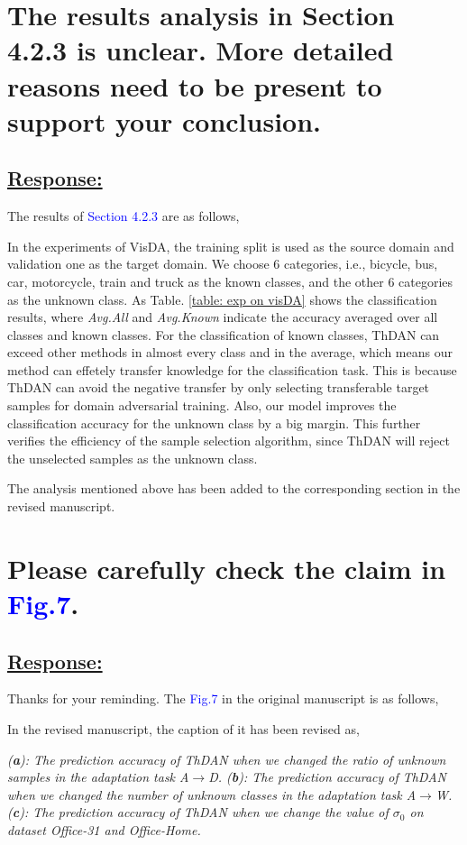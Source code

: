 \section{The results analysis in Section 4.2.3 is unclear. More detailed reasons need to be present to support your conclusion.}
\subsection*{\underline{\textbf{Response:}}}

The results of \textcolor{blue}{Section 4.2.3} are as follows,


In the experiments of VisDA, the training split is used as the source domain and validation one as the target domain.
We choose 6 categories, i.e., bicycle, bus, car, motorcycle, train and truck as the known classes, and the other 6 categories as the unknown class.
As Table. \ref{table: exp on visDA} shows the classification results, where \textit{Avg.All} and \textit{Avg.Known} indicate the accuracy averaged over all classes and known classes.
For the classification of known classes, ThDAN can exceed other methods in almost every class and in the average, which means our method can effetely transfer knowledge for the classification task.
This is because ThDAN can avoid the negative transfer by only selecting transferable target samples for domain adversarial training.
Also, our model improves the classification accuracy for the unknown class by a big margin.
This further verifies the efficiency of the sample selection algorithm, since ThDAN will reject the unselected samples as the unknown class.

The analysis mentioned above has been added to the corresponding section in the revised manuscript.

\section{Please carefully check the claim in \textcolor{blue}{Fig.7}.}
\subsection*{\underline{\textbf{Response:}}}

Thanks for your reminding.
The \textcolor{blue}{Fig.7} in the original manuscript is as follows,


In the revised manuscript, the caption of it has been revised as,
\begin{siderules}
    \textit{
        \footnotesize
        (\textbf{a}):
        The prediction accuracy of ThDAN when we changed the ratio of unknown samples in the adaptation task \textit{A$\to$D}.
        (\textbf{b}):
        The prediction accuracy of ThDAN when we changed the number of unknown classes in the adaptation task \textit{A$\to$W}.
        (\textbf{c}): The prediction accuracy of ThDAN when we change the value of $\sigma_0$ on dataset Office-31 and Office-Home.
    }
\end{siderules}


